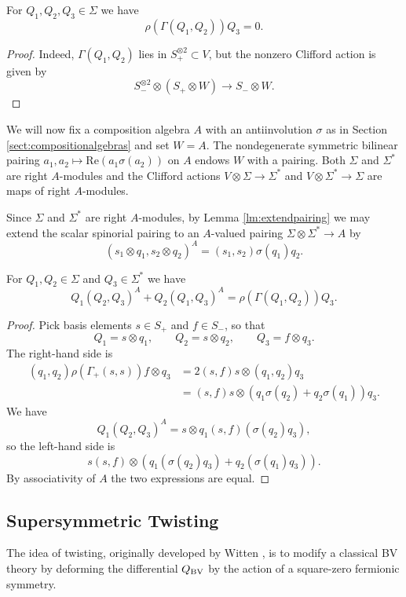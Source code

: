 \documentclass[10pt, oneside]{article}
\renewcommand{\Re}{\mathrm{Re}}
\begin{document}
\begin{theorem}
For $Q_1, Q_2, Q_3\in\Sigma$ we have
\[\rho(\Gamma(Q_1, Q_2))Q_3 = 0.\]
\label{thm:2d3psi}
\end{theorem}
\begin{proof}
Indeed, $\Gamma(Q_1, Q_2)$ lies in $S_+^{\otimes 2}\subset V$, but the nonzero Clifford action is given by
\[S_-^{\otimes 2}\otimes (S_+\otimes W)\longrightarrow S_-\otimes W.\]
\end{proof}

We will now fix a composition algebra $A$ with an antiinvolution $\sigma$ as in Section \ref{sect:compositionalgebras} and set $W = A$. The nondegenerate symmetric bilinear pairing $a_1, a_2\mapsto \Re(a_1\sigma(a_2))$ on $A$ endows $W$ with a pairing. Both $\Sigma$ and $\Sigma^*$ are right $A$-modules and the Clifford actions $V\otimes \Sigma\rightarrow \Sigma^*$ and $V\otimes \Sigma^*\rightarrow \Sigma$ are maps of right $A$-modules.

Since $\Sigma$ and $\Sigma^*$ are right $A$-modules, by Lemma \ref{lm:extendpairing} we may extend the scalar spinorial pairing to an $A$-valued pairing $\Sigma\otimes \Sigma^*\rightarrow A$ by
\[(s_1\otimes q_1, s_2\otimes q_2)^A = (s_1, s_2)\sigma(q_1) q_2.\]

\begin{theorem}
For $Q_1, Q_2\in\Sigma$ and $Q_3\in\Sigma^*$ we have
\[Q_1(Q_2, Q_3)^A + Q_2(Q_1, Q_3)^A = \rho(\Gamma(Q_1, Q_2))Q_3.\]
\label{thm:2dmatter3psi}
\end{theorem}
\begin{proof}
Pick basis elements $s\in S_+$ and $f\in S_-$, so that
\[Q_1 = s\otimes q_1,\qquad Q_2 = s\otimes q_2,\qquad Q_3 = f\otimes q_3.\]
The right-hand side is
\begin{align*}
(q_1, q_2) \rho(\Gamma_+(s, s)) f\otimes q_3 &= 2(s, f) s\otimes (q_1, q_2) q_3 \\
&= (s, f) s\otimes (q_1\sigma(q_2) + q_2\sigma(q_1)) q_3.
\end{align*}
We have
\[Q_1(Q_2, Q_3)^A = s\otimes q_1 (s, f) (\sigma(q_2)q_3),\]
so the left-hand side is
\[s(s, f)\otimes (q_1(\sigma(q_2) q_3) + q_2(\sigma(q_1)q_3)).\]
By associativity of $A$ the two expressions are equal.
\end{proof}

\subsection{Supersymmetric Twisting}
The idea of twisting, originally developed by Witten \cite{WittenTQFT}, is to modify a classical BV theory by deforming the differential $Q_{\mathrm{BV}}$ by the action of a square-zero fermionic symmetry. 
\end{document}
